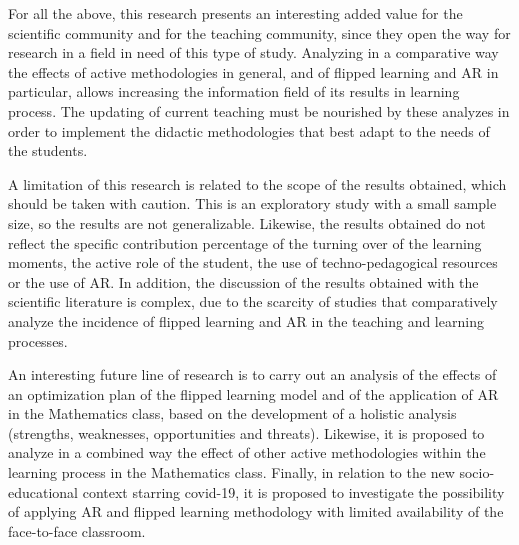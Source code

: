 \documentclass[english]{textolivre}
\begin{document}
For all the above, this research presents an interesting added value for the scientific community and for the teaching community, since they open the way for research in a field in need of this type of study. Analyzing in a comparative way the effects of active methodologies in general, and of flipped learning and AR in particular, allows increasing the information field of its results in learning process. The updating of current teaching must be nourished by these analyzes in order to implement the didactic methodologies that best adapt to the needs of the students.

A limitation of this research is related to the scope of the results obtained, which should be taken with caution. This is an exploratory study with a small sample size, so the results are not generalizable. Likewise, the results obtained do not reflect the specific contribution percentage of the turning over of the learning moments, the active role of the student, the use of techno-pedagogical resources or the use of AR. In addition, the discussion of the results obtained with the scientific literature is complex, due to the scarcity of studies that comparatively analyze the incidence of flipped learning and AR in the teaching and learning processes.

An interesting future line of research is to carry out an analysis of the effects of an optimization plan of the flipped learning model and of the application of AR in the Mathematics class, based on the development of a holistic analysis (strengths, weaknesses, opportunities and threats). Likewise, it is proposed to analyze in a combined way the effect of other active methodologies within the learning process in the Mathematics class. Finally, in relation to the new socio-educational context starring covid-19, it is proposed to investigate the possibility of applying AR and flipped learning methodology with limited availability of the face-to-face classroom.







\printbibliography\label{sec-bib}
\end{document}
